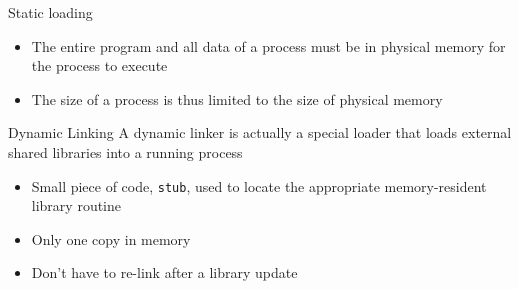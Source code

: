\begin{frame}{Static loading}
  \begin{itemize}
  \item The entire program and all data of a process must be in physical memory for the
    process to execute
  \item The size of a process is thus limited to the size of physical memory
  \end{itemize}
  \begin{center}
     
  \end{center}
\end{frame}


\begin{frame}{Dynamic Linking}
  A \alert{dynamic linker} is actually a special loader that loads external shared
  libraries into a running process
  \begin{itemize}
  \item Small piece of code, \texttt{stub}, used to locate the appropriate memory-resident
    library routine
  \item Only one copy in memory
  \item Don't have to re-link after a library update
  \end{itemize}
  \begin{center}
  \end{center}
\end{frame}

